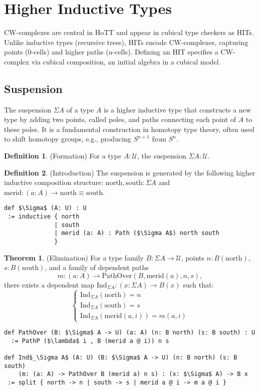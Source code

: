 \documentclass{article}
\theoremstyle{definition}
\newtheorem{theorem}{Theorem}
\newtheorem{definition}{Definition}
\begin{document}
\section{Higher Inductive Types}
CW-complexes are central in HoTT and appear in cubical type checkers as HITs.
Unlike inductive types (recursive trees), HITs encode CW-complexes, capturing
points (0-cells) and higher paths (n-cells). Defining an HIT specifies a CW-complex
via cubical composition, an initial algebra in a cubical model.

\newpage

\subsection{Suspension}
The suspension $\Sigma A$ of a type $A$ is a higher inductive type that
constructs a new type by adding two points, called poles, and paths connecting
each point of $A$ to these poles. It is a fundamental construction in homotopy
type theory, often used to shift homotopy groups, e.g., producing $S^{n+1}$ from $S^n$.

\begin{definition} (Formation)
For a type $A : \mathcal{U}$, the suspension $\Sigma A : \mathcal{U}$.
\end{definition}

\begin{definition} (Introduction)
The suspension is generated by the following higher inductive composition structure:
$\text{north},\text{south} : \Sigma A$ and $\text{merid} : (a : A) \to \text{north} \equiv \text{south}$.
\begin{lstlisting}[mathescape=true]
def $\Sigma$ (A: U) : U
 := inductive { north
              | south
              | merid (a: A) : Path ($\Sigma A$) north south
              }
\end{lstlisting}
\end{definition}

\begin{theorem} (Elimination)
For a type family $B : \Sigma A \to \mathcal{U}$, points $n : B(\text{north})$, $s : B(\text{south})$, and a family of
dependent paths
$$
  m : (a : A) \to \text{PathOver}(B,\text{merid}(a),n,s),
$$
there exists a dependent map $\text{Ind}_{\Sigma A} : (x : \Sigma A) \to B(x)$ such that:
\[
\begin{cases}
\text{Ind}_{\Sigma A}(\text{north}) = n \\
\text{Ind}_{\Sigma A}(\text{south}) = s \\
\text{Ind}_{\Sigma A}(\text{merid}(a,i)) = m(a,i)
\end{cases}
\]
\begin{lstlisting}[mathescape=true]
def PathOver (B: $\Sigma$ A -> U) (a: A) (n: B north) (s: B south) : U
  := PathP ($\lambda$ i , B (merid a @ i)) n s

def Ind$_\Sigma A$ (A: U) (B: $\Sigma$ A -> U) (n: B north) (s: B south)
    (m: (a: A) -> PathOver B (merid a) n s) : (x: $\Sigma$ A) -> B x
 := split { north -> n | south -> s | merid a @ i -> m a @ i }
\end{lstlisting}
\end{theorem}
\end{document}
